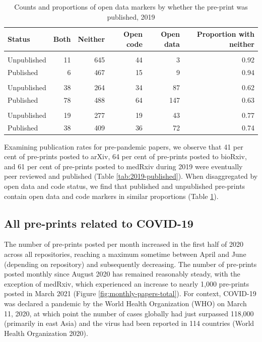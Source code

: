 \documentclass[
]{article}
\begin{document}
\begin{table}

\caption{\label{tab:2019-open-publishing}Counts and proportions of open data markers by whether the pre-print was published, 2019}
\centering
\begin{tabular}[t]{lrrrrr}
\toprule
Status & Both & Neither & Open code & Open data & Proportion with neither\\
\midrule
\addlinespace[0.3em]
\multicolumn{6}{l}{\textbf{arXiv}}\\
\hspace{1em}Unpublished & 11 & 645 & 44 & 3 & 0.92\\
\hspace{1em}Published & 6 & 467 & 15 & 9 & 0.94\\
\addlinespace[0.3em]
\multicolumn{6}{l}{\textbf{bioRxiv}}\\
\hspace{1em}Unpublished & 38 & 264 & 34 & 87 & 0.62\\
\hspace{1em}Published & 78 & 488 & 64 & 147 & 0.63\\
\addlinespace[0.3em]
\multicolumn{6}{l}{\textbf{medRxiv}}\\
\hspace{1em}Unpublished & 19 & 277 & 19 & 43 & 0.77\\
\hspace{1em}Published & 38 & 409 & 36 & 72 & 0.74\\
\bottomrule
\end{tabular}
\end{table}

Examining publication rates for pre-pandemic papers, we observe that 41 per cent of pre-prints posted to arXiv, 64 per cent of pre-prints posted to bioRxiv, and 61 per cent of pre-prints posted to medRxiv during 2019 were eventually peer reviewed and published (Table \ref{tab:2019-published}). When disaggregated by open data and code status, we find that published and unpublished pre-prints contain open data and code markers in similar proportions (Table \ref{tab:2019-open-publishing}).

\hypertarget{all-pre-prints-related-to-covid-19}{%
\subsection{All pre-prints related to COVID-19}\label{all-pre-prints-related-to-covid-19}}

The number of pre-prints posted per month increased in the first half of 2020 across all repositories, reaching a maximum sometime between April and June (depending on repository) and subsequently decreasing. The number of pre-prints posted monthly since August 2020 has remained reasonably steady, with the exception of medRxiv, which experienced an increase to nearly 1,000 pre-prints posted in March 2021 (Figure \ref{fig:monthly-papers-total}). For context, COVID-19 was declared a pandemic by the World Health Organization (WHO) on March 11, 2020, at which point the number of cases globally had just surpassed 118,000 (primarily in east Asia) and the virus had been reported in 114 countries (World Health Organization 2020).
\end{document}
